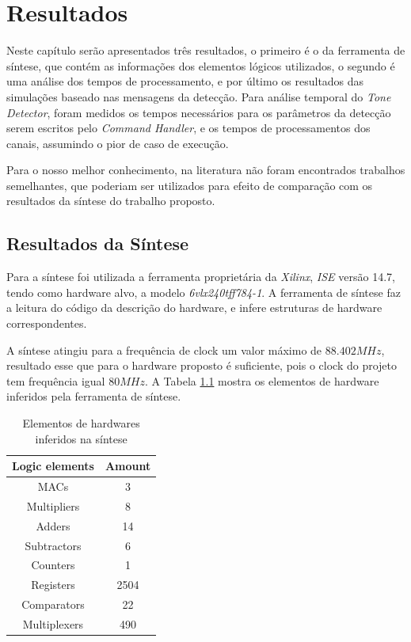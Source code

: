 \documentclass[monografia]{subfiles}
\begin{document}
\chapter{Resultados}	
\label{sec:resultsSection}
	Neste capítulo serão apresentados três resultados, 
	o primeiro é o da ferramenta de síntese, que contém as informações dos elementos lógicos utilizados, 
	o segundo é uma análise dos tempos de processamento, 
	e por último os resultados das simulações baseado nas mensagens da detecção.
	Para análise temporal do \textit{Tone Detector}, foram medidos os tempos necessários para os parâmetros da detecção serem escritos pelo 
	\textit{Command Handler}, e os tempos de processamentos dos canais, assumindo o pior de caso de execução. 
	

	Para o nosso melhor conhecimento, 
	na literatura não foram encontrados trabalhos semelhantes, que poderiam ser utilizados para efeito de comparação com os resultados da síntese
	do trabalho proposto.


	\section{Resultados da Síntese}
		Para a síntese foi utilizada a ferramenta proprietária da \textit{Xilinx}, \textit{ISE} versão 14.7, tendo como hardware alvo, a  
		modelo \textit{6vlx240tff784-1}. A ferramenta de síntese faz a leitura do código da descrição do hardware, e infere estruturas de hardware 
		correspondentes.

		A síntese atingiu para a frequência de clock um valor máximo de $88.402 MHz$, resultado esse que para o hardware proposto 
		é suficiente, pois o clock do projeto tem frequência igual $80 MHz$. A Tabela \ref{tab:hardwareInferedAmount} mostra os elementos de hardware 
		inferidos pela ferramenta de síntese.


		\begin{table}[!h]
		\centering
		\caption{Elementos de hardwares inferidos na síntese}
		\label{tab:hardwareInferedAmount}
		\begin{tabular}{|c|c|}
			\hline
				\textbf{Logic elements} & \textbf{Amount} \\ \hline
				MACs                    & 3               \\ \hline
				Multipliers             & 8               \\ \hline
				Adders                  & 14              \\ \hline
				Subtractors             & 6               \\ \hline
				Counters                & 1               \\ \hline
				Registers               & 2504            \\ \hline
				Comparators             & 22              \\ \hline
				Multiplexers            & 490             \\ \hline
		\end{tabular}
		\end{table}
\end{document}
